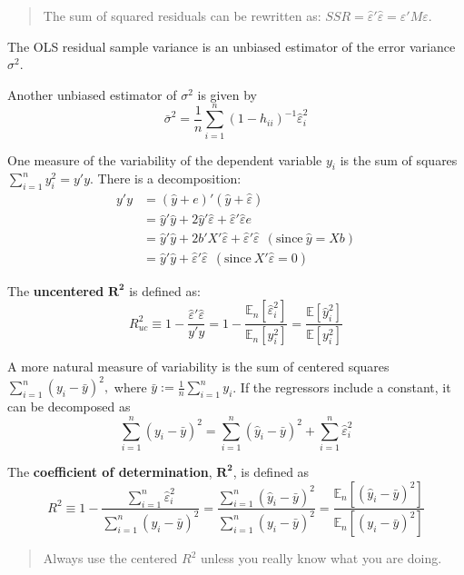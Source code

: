 \documentclass[12pt,]{book}
\begin{document}
\begin{quote}
The sum of squared residuals can be rewritten as: \(SSR = \hat \varepsilon' \hat \varepsilon = \varepsilon' M \varepsilon\).
\end{quote}

The OLS residual sample variance is an unbiased estimator of the error variance \(\sigma^2\).

Another unbiased estimator of \(\sigma^2\) is given by
\[
  \bar \sigma^2 = \frac{1}{n} \sum _ {i=1}^n (1-h_{ii})^{-1} \hat \varepsilon_i^2
\]

One measure of the variability of the dependent variable \(y_i\) is the sum of squares \(\sum _ {i=1}^n y_i^2 = y'y\). There is a decomposition:
\[
\begin{aligned}
    y'y &= (\hat y + e)' (\hat y + \hat \varepsilon) \\
    &= \hat y' \hat y + 2 \hat y' \hat \varepsilon + \hat \varepsilon' \hat \varepsilon e \\
    &= \hat y' \hat y + 2 b'X'\hat \varepsilon + \hat \varepsilon' \hat \varepsilon \ \ (\text{since} \ \hat y = Xb) \\
    &= \hat y' \hat y + \hat \varepsilon'\hat \varepsilon \ \ (\text{since} \ X'\hat \varepsilon =0)
\end{aligned}
\]

The \textbf{uncentered} \(\mathbf{R^2}\) is defined as:
\[
    R^2 _ {uc} \equiv 1 - \frac{\hat \varepsilon'\hat \varepsilon}{y'y} = 1 - \frac{\mathbb E_n[\hat \varepsilon_i^2]}{\mathbb E_n[y_i^2]} = \frac{ \mathbb E [\hat y_i^2]}{ \mathbb E [y_i^2]}
\]

A more natural measure of variability is the sum of centered squares \(\sum _ {i=1}^n (y_i - \bar y)^2,\) where \(\bar y := \frac{1}{n}\sum _ {i=1}^n y_i\). If the regressors include a constant, it can be decomposed as
\[
  \sum _ {i=1}^n (y_i - \bar y)^2 = \sum _ {i=1}^n (\hat y_i - \bar y)^2 + \sum _ {i=1}^n \hat \varepsilon_i^2
\]

The \textbf{coefficient of determination}, \(\mathbf{R^2}\), is defined as
\[
    R^2 \equiv 1 - \frac{\sum _ {i=1}^n \hat \varepsilon_i^2}{\sum _ {i=1}^n (y_i - \bar y)^2 }= \frac{  \sum _ {i=1}^n (\hat y_i - \bar y)^2 } { \sum _ {i=1}^n (y_i - \bar y)^2} = \frac{\mathbb E_n[(\hat y_i - \bar y)^2]}{\mathbb E_n[(y_i - \bar y)^2]}
\]

\begin{quote}
Always use the centered \(R^2\) unless you really know what you are doing.
\end{quote}
\end{document}
